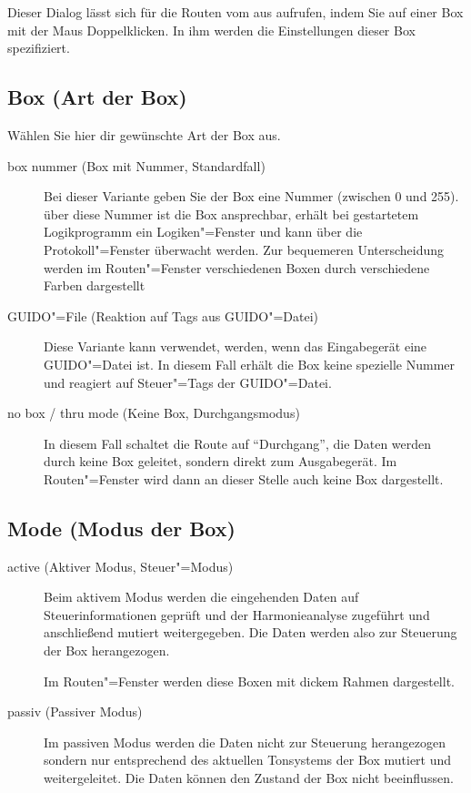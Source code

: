 {Dieser Dialog lässt sich für die Routen vom  
aus aufrufen, indem Sie auf einer Box mit der Maus Doppelklicken. 
In ihm werden die Einstellungen dieser Box spezifiziert.

\subsection{Box (Art der Box)} Wählen Sie hier dir gewünschte Art der
Box aus.

\begin{description}
\item[box nummer (Box mit Nummer, Standardfall)] Bei dieser Variante
  geben Sie der Box eine Nummer (zwischen 0 und 255). über diese
  Nummer ist die Box ansprechbar, erhält bei gestartetem Logikprogramm
  ein Logiken"=Fenster und kann über die Protokoll"=Fenster überwacht
  werden. Zur bequemeren Unterscheidung werden im Routen"=Fenster
  verschiedenen Boxen durch verschiedene Farben dargestellt
\item[GUIDO"=File (Reaktion auf Tags aus GUIDO"=Datei)] Diese Variante
  kann verwendet, werden, wenn das Eingabegerät eine GUIDO"=Datei ist.
  In diesem Fall erhält die Box keine spezielle Nummer und reagiert
  auf Steuer"=Tags der GUIDO"=Datei.
\item[no box / thru mode (Keine Box, Durchgangsmodus)] In diesem Fall
  schaltet die Route auf ``Durchgang'', die Daten werden durch keine
  Box geleitet, sondern direkt zum Ausgabegerät.  Im Routen"=Fenster
  wird dann an dieser Stelle auch keine Box dargestellt.
\end{description}

\subsection{Mode (Modus der Box)}
\begin{description}
\item[active (Aktiver Modus, Steuer"=Modus)] Beim aktivem Modus werden
  die eingehenden Daten auf Steuerinformationen geprüft und der
  Harmonieanalyse zugeführt und anschließend mutiert weitergegeben.
  Die Daten werden also zur Steuerung der Box herangezogen.

  Im Routen"=Fenster werden diese Boxen mit dickem Rahmen dargestellt.
\item[passiv (Passiver Modus)] Im passiven Modus werden die Daten
  nicht zur Steuerung herangezogen sondern nur entsprechend des
  aktuellen Tonsystems der Box mutiert und weitergeleitet. Die Daten
  können den Zustand der Box nicht beeinflussen.



\end{description}}
